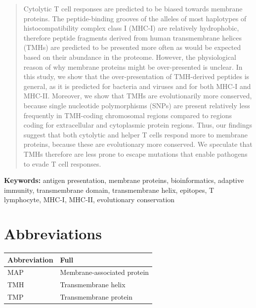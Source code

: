 \begin{abstract}

Cytolytic T cell responses are predicted to be biased towards membrane proteins. 
The peptide-binding grooves of the alleles of most haplotypes
of histocompatibility complex class I (MHC-I) are relatively hydrophobic, 
therefore peptide fragments derived from human transmembrane helices (TMHs) are predicted to be presented more often as would be expected 
based on their abundance in the proteome. However, the physiological reason of why membrane proteins might be over-presented is unclear. 
In this study, we show that the over-presentation of TMH-derived peptides is general, as it is predicted for bacteria and viruses 
and for both MHC-I and MHC-II. Moreover, we show that TMHs are evolutionarily more conserved, 
because single nucleotide polymorphisms (SNPs) are present 
relatively less frequently in TMH-coding chromosomal regions 
compared to regions coding for extracellular and cytoplasmic protein regions. 
Thus, our findings suggest that 
both cytolytic and helper T cells respond more to membrane proteins, 
because these are evolutionary more conserved. 
We speculate that TMHs therefore are less prone to escape mutations 
that enable pathogens to evade T cell responses.

\end{abstract}

{\bf Keywords:} antigen presentation, membrane proteins, bioinformatics, 
adaptive immunity, transmembrane domain, transmembrane helix, 
epitopes, T lymphocyte, MHC-I, MHC-II, evolutionary conservation

\section*{Abbreviations}

\begin{table}[h]
  \begin{tabular}{ll}
    Abbreviation & Full               \\ 
    \hline
    MAP & Membrane-associated protein \\
    TMH & Transmembrane helix         \\
    TMP & Transmembrane protein
  \end{tabular}
\end{table}

